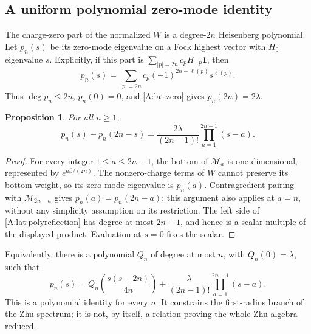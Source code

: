 \documentclass[11pt]{article}
\newtheorem{proposition}[theorem]{Proposition}
\newcommand{\one}{\mathbf1}\newcommand{\D}{\mathcal D}\newcommand{\Dcat}{\mathcal D}
\numberwithin{equation}{section}
\begin{document}
\subsection{A uniform polynomial zero-mode identity}
The charge-zero part of the normalized $W$ is a degree-$2n$ Heisenberg polynomial. Let $p_n(s)$ be its zero-mode eigenvalue on a Fock highest vector with $H_0$ eigenvalue $s$. Explicitly, if this part is $\sum_{|p|=2n}c_pH_{-p}\one$, then
\[
 p_n(s)=\sum_{|p|=2n}c_p(-1)^{2n-\ell(p)}s^{\ell(p)}.
\]
Thus $\deg p_n\leq2n$, $p_n(0)=0$, and \eqref{A:lat:zero} gives $p_n(2n)=2\lambda$.

\begin{proposition}\label{A:lat:reflection}
For all $n\geq1$,
\begin{equation}\label{A:lat:polyreflection}
 p_n(s)-p_n(2n-s)=
 \frac{2\lambda}{(2n-1)!}\prod_{a=1}^{2n-1}(s-a).
\end{equation}
\end{proposition}
\begin{proof}
For every integer $1\leq a\leq2n-1$, the bottom of $\mathcal M_a$ is one-dimensional, represented by $e^{a\beta/(2n)}$. The nonzero-charge terms of $W$ cannot preserve its bottom weight, so its zero-mode eigenvalue is $p_n(a)$. Contragredient pairing with $\mathcal M_{2n-a}$ gives $p_n(a)=p_n(2n-a)$; this argument also applies at $a=n$, without any simplicity assumption on its restriction. The left side of \eqref{A:lat:polyreflection} has degree at most $2n-1$, and hence is a scalar multiple of the displayed product. Evaluation at $s=0$ fixes the scalar.
\end{proof}

Equivalently, there is a polynomial $Q_n$ of degree at most $n$, with $Q_n(0)=\lambda$, such that
\[
 p_n(s)=Q_n\left(\frac{s(s-2n)}{4n}\right)
 +\frac{\lambda}{(2n-1)!}\prod_{a=1}^{2n-1}(s-a).
\]
This is a polynomial identity for every $n$. It constrains the first-radius branch of the Zhu spectrum; it is not, by itself, a relation proving the whole Zhu algebra reduced.
\end{document}
